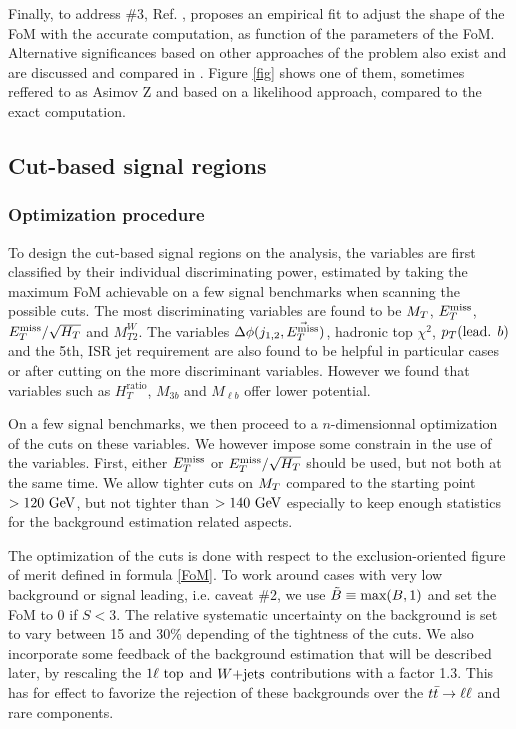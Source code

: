     Finally, to address \#3, Ref. \cite{Punzi}, proposes an empirical fit to adjust the
    shape of the FoM with the accurate computation, as function of the parameters
    of the FoM. Alternative significances based on other approaches of the problem also
    exist and are discussed and compared in .
    Figure \ref{fig} shows one of them, sometimes reffered to as Asimov Z and based on a 
    likelihood approach, compared to the exact computation.


        \subsection{Cut-based signal regions}

            \subsubsection{Optimization procedure}

    To design the cut-based signal regions on the analysis, the variables are first 
    classified by their individual discriminating power, estimated by taking the 
    maximum FoM achievable on a few signal benchmarks when scanning the possible 
    cuts. The most discriminating variables are found to be $M_T$, $E_T^\text{miss}$, 
    $E_T^\text{miss}/\sqrt{H_T}$ and $M_{T2}^{W}$. The variables $\Delta \phi(j_{1,2},\vec{E_T^\text{miss}})$, 
    hadronic top $\chi^2$, $p_T(\text{lead. } b)$ and the 5th, ISR jet requirement are
    also found to be helpful in particular cases or after cutting on the more discriminant
    variables. However we found that variables such as $H_T^\text{ratio}$, $M_{3b}$ and
    $M_{\ell b}$ offer lower potential.

    On a few signal benchmarks, we then proceed to a $n$-dimensionnal optimization of the
    cuts on these variables. We however impose some constrain in the use of the variables.
    First, either $E_T^\text{miss}$ or $E_T^\text{miss}/\sqrt{H_T}$ should be used, but not both at the same time.
    We allow tighter cuts on $M_T$ compared to the starting point $> 120~\text{GeV}$, but not
    tighter than $> 140~\text{GeV}$ especially to keep enough statistics for the background
    estimation related aspects.

    The optimization of the cuts is done with respect to the exclusion-oriented figure of 
    merit defined in formula \ref{FoM}. To work around cases with very low background or signal leading,
    i.e. caveat \#2, we use $\tilde{B} \equiv \text{max}(B,1)$ and set the FoM to 0
    if $S < 3$. The relative systematic uncertainty on the background is set to vary between
    15 and 30\% depending of the tightness of the cuts. We also incorporate some feedback
    of the background estimation that will be described later, by rescaling the $1\ell~\text{top}$
    and $\text{$W$+jets}$ contributions with a factor 1.3. This has for effect to favorize the
    rejection of these backgrounds over the $t\bar{t} \rightarrow \ell \ell$ and rare components.

